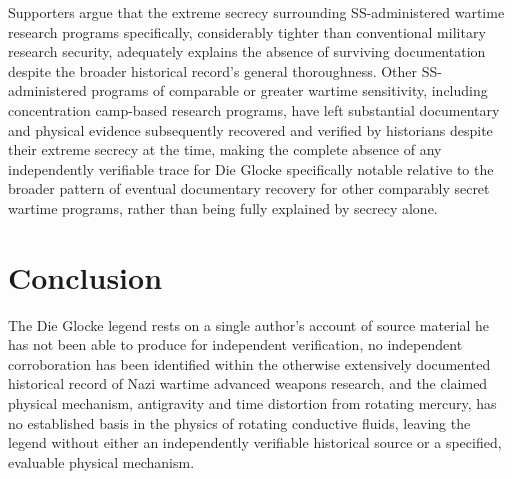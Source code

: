 \documentclass[11pt]{article}
\begin{document}
Supporters argue that the extreme secrecy surrounding SS-administered wartime research programs specifically, considerably tighter than conventional military research security, adequately explains the absence of surviving documentation despite the broader historical record's general thoroughness. Other SS-administered programs of comparable or greater wartime sensitivity, including concentration camp-based research programs, have left substantial documentary and physical evidence subsequently recovered and verified by historians despite their extreme secrecy at the time, making the complete absence of any independently verifiable trace for Die Glocke specifically notable relative to the broader pattern of eventual documentary recovery for other comparably secret wartime programs, rather than being fully explained by secrecy alone.

\section{Conclusion}

The Die Glocke legend rests on a single author's account of source material he has not been able to produce for independent verification, no independent corroboration has been identified within the otherwise extensively documented historical record of Nazi wartime advanced weapons research, and the claimed physical mechanism, antigravity and time distortion from rotating mercury, has no established basis in the physics of rotating conductive fluids, leaving the legend without either an independently verifiable historical source or a specified, evaluable physical mechanism.
\end{document}
